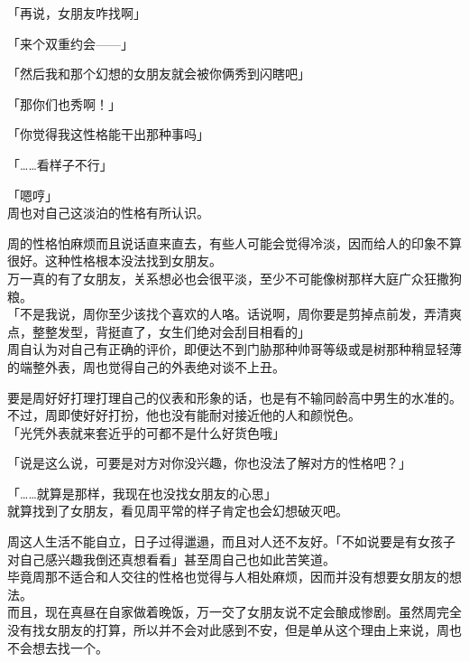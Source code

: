 「再说，女朋友咋找啊」

「来个双重约会——」

「然后我和那个幻想的女朋友就会被你俩秀到闪瞎吧」

「那你们也秀啊！」

「你觉得我这性格能干出那种事吗」

「……看样子不行」

「嗯哼」\\

周也对自己这淡泊的性格有所认识。

周的性格怕麻烦而且说话直来直去，有些人可能会觉得冷淡，因而给人的印象不算很好。这种性格根本没法找到女朋友。\\

万一真的有了女朋友，关系想必也会很平淡，至少不可能像树那样大庭广众狂撒狗粮。\\

「不是我说，周你至少该找个喜欢的人咯。话说啊，周你要是剪掉点前发，弄清爽点，整整发型，背挺直了，女生们绝对会刮目相看的」\\%

周自认为对自己有正确的评价，即便达不到门胁那种帅哥等级或是树那种稍显轻薄的端整外表，周也觉得自己的外表绝对谈不上丑。

要是周好好打理打理自己的仪表和形象的话，也是有不输同龄高中男生的水准的。\\

不过，周即使好好打扮，他也没有能耐对接近他的人和颜悦色。\\ 

「光凭外表就来套近乎的可都不是什么好货色哦」

「说是这么说，可要是对方对你没兴趣，你也没法了解对方的性格吧？」

「……就算是那样，我现在也没找女朋友的心思」\\

就算找到了女朋友，看见周平常的样子肯定也会幻想破灭吧。

周这人生活不能自立，日子过得邋遢，而且对人还不友好。「不如说要是有女孩子对自己感兴趣我倒还真想看看」甚至周自己也如此苦笑道。\\%

毕竟周那不适合和人交往的性格也觉得与人相处麻烦，因而并没有想要女朋友的想法。\\

而且，现在真昼在自家做着晚饭，万一交了女朋友说不定会酿成惨剧。虽然周完全没有找女朋友的打算，所以并不会对此感到不安，但是单从这个理由上来说，周也不会想去找一个。\\

